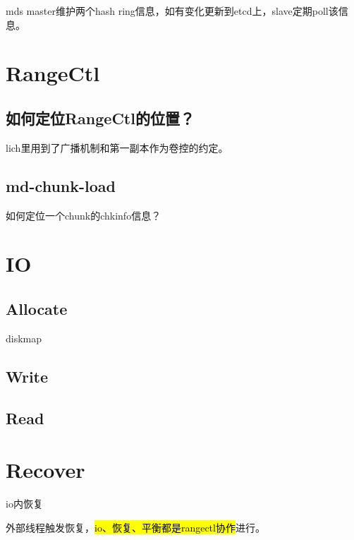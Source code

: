 
mds master维护两个hash ring信息，如有变化更新到etcd上，slave定期poll该信息。

\section{RangeCtl}

\subsection{如何定位RangeCtl的位置？}

lich里用到了广播机制和第一副本作为卷控的约定。

\subsection{md-chunk-load}

如何定位一个chunk的chkinfo信息？


\section{IO}

\subsection{Allocate}

diskmap

\subsection{Write}

\subsection{Read}

\section{Recover}


io内恢复


外部线程触发恢复，\hl{io、恢复、平衡都是rangectl协作}进行。

